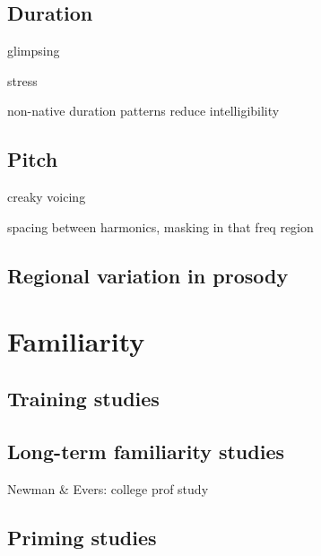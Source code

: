 \subsection{Duration}
\begin{itm}
	\item{glimpsing}
	\item{stress}
	\item{non-native duration patterns reduce intelligibility\citep{QueneVanDelft2010}}
\end{itm}

\subsection{Pitch}
\begin{itm}
	\item{creaky voicing}
	\item{spacing between harmonics, masking in that freq region}
\end{itm}

\subsection{Regional variation in prosody}

\section{Familiarity}
\subsection{Training studies}
\subsection{Long-term familiarity studies}
Newman \& Evers: college prof study\citep{NewmanEvers2007}

\subsection{Priming studies}
